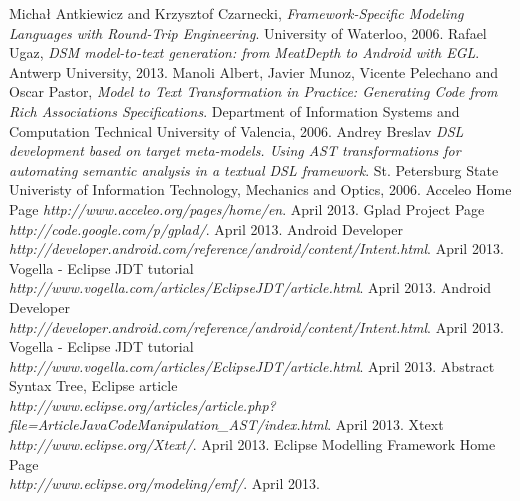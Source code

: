 \begin{thebibliography}{9}

  Michał Antkiewicz and Krzysztof Czarnecki,
  \emph{Framework-Specific Modeling Languages with Round-Trip Engineering}.
  University of Waterloo,
  2006.  
  Rafael Ugaz,
  \emph{DSM model-to-text generation: from MeatDepth to Android with EGL}.
  Antwerp University,
  2013. 
  Manoli Albert, Javier Munoz, Vicente Pelechano and Oscar Pastor,
  \emph{Model to Text Transformation in Practice: Generating Code from Rich Associations Specifications}.
  Department of Information Systems and Computation Technical University of Valencia,
  2006.   
  Andrey Breslav
  \emph{DSL development based on target meta-models. Using AST transformations for automating semantic analysis in a textual DSL framework}.
  St. Petersburg State Univeristy of Information Technology, Mechanics and Optics,
  2006. 
  Acceleo Home Page
  \emph{http://www.acceleo.org/pages/home/en}.
  April 2013.   
  Gplad Project Page
  \emph{http://code.google.com/p/gplad/}.
  April 2013. 
  Android Developer
  \emph{http://developer.android.com/reference/android/content/Intent.html}.
  April 2013.   
  Vogella - Eclipse JDT tutorial
  \emph{http://www.vogella.com/articles/EclipseJDT/article.html}.
  April 2013. 
  Android Developer\\
  \emph{http://developer.android.com/reference/android/content/Intent.html}.
  April 2013.   
  Vogella - Eclipse JDT tutorial\\
  \emph{http://www.vogella.com/articles/EclipseJDT/article.html}.
  April 2013.      
  Abstract Syntax Tree, Eclipse article\\
  \emph{http://www.eclipse.org/articles/article.php?file=Article\-JavaCodeManipulation\_AST/index.html}.
  April 2013.  
  Xtext
  \emph{http://www.eclipse.org/Xtext/}.
  April 2013.   
  Eclipse Modelling Framework Home Page\\
  \emph{http://www.eclipse.org/modeling/emf/}.
  April 2013.   
\end{thebibliography}
